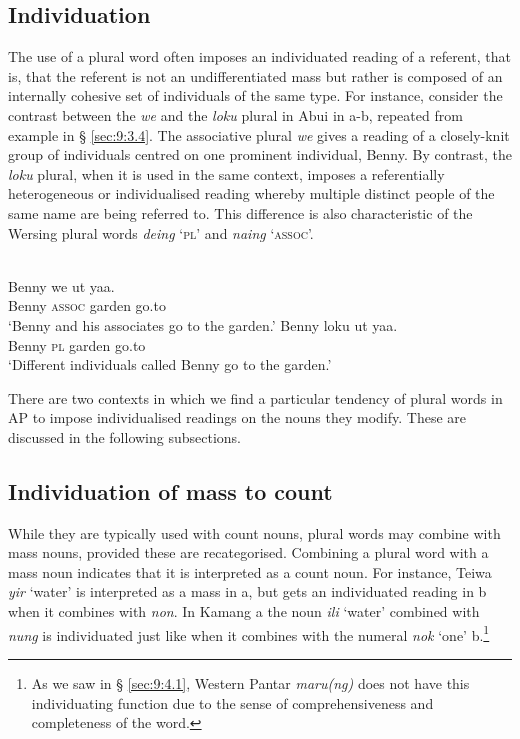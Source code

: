 \subsection{Individuation} %
\label{sec:9:4.3}
The use of a plural word often imposes an individuated reading of a referent, that is, that the referent is not an undifferentiated mass but rather is composed of an internally cohesive set of individuals of the same type. For instance, consider the contrast between the \textit{we} and the \textit{loku} plural in Abui in a-b, repeated from example  in {\S} \ref{sec:9:3.4}. The associative plural \textit{we} gives a reading of a closely-knit group of individuals centred on one prominent individual, Benny. By contrast, the \textit{loku} plural, when it is used in the same context, imposes a referentially heterogeneous or individualised reading whereby multiple distinct people of the same name are being referred to. This difference is also characteristic of the Wersing plural words \textit{deing} `\textsc{pl}' and \textit{naing} `\textsc{assoc}'.


\ea%
\label{ex:9:76}
 \\
\ea
\gll Benny we ut yaa. \\
   Benny \textsc{assoc} garden go.to \\
\glt `Benny and his associates go to the garden.'
\ex
\gll Benny loku ut yaa.\\
  Benny \textsc{pl} garden go.to  \\
\glt  `Different individuals called Benny go to the garden.'
\z
\z





There are two contexts in which we find a particular tendency of plural words in AP to impose individualised readings on the nouns they modify. These are discussed in the following subsections.

\subsection{Individuation of mass to count}
While they are typically used with count nouns, plural words may combine with mass nouns, provided these are recategorised. Combining a plural word with a mass noun indicates that it is interpreted as a count noun. For instance, Teiwa \textit{yir} `water' is interpreted as a mass in a, but gets an individuated reading in b when it combines with \textit{non}. In Kamang a the noun \textit{ili} `water' combined with \textit{nung} is individuated just like when it combines with the numeral \textit{nok} `one' b.\footnote{ As we saw in {\S} \ref{sec:9:4.1}, Western Pantar \textit{maru(ng)} does not have this individuating function due to the sense of comprehensiveness and completeness of the word.}


